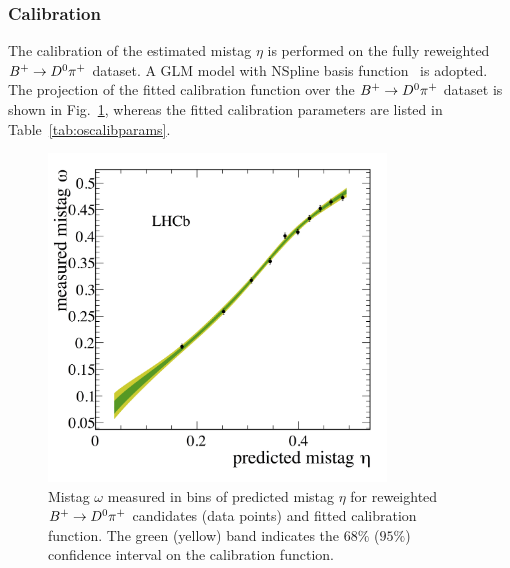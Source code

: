 \subsubsection{Calibration}
\label{sec:tagging:OScalib:calibration}
The calibration of the estimated mistag $\eta$ is performed on the fully reweighted $B^+\rightarrow D^0\pi^+$ dataset. 
A GLM model with NSpline basis function~\cite{EPM} is adopted.
The projection of the fitted calibration function over the $B^+\rightarrow D^0\pi^+$ dataset is shown in Fig.~\ref{fig:oscalibplot},
whereas the fitted calibration parameters are listed in Table~\ref{tab:oscalibparams}.
\begin{figure}[htbp]
        \begin{center}
                \includegraphics[width=0.80\textwidth]{04Flavourtagging/figs/OS_Combination_Calibration_Data.png}
        \end{center}
        \vspace{-5mm}
        \caption{Mistag $\omega$ measured in bins of predicted mistag $\eta$ for reweighted $B^+\rightarrow D^0\pi^+$ candidates (data points) and fitted calibration function. The green (yellow) band indicates the $68\%$ ($95\%$) confidence interval on the calibration function.}
        \label{fig:oscalibplot}
\end{figure}
